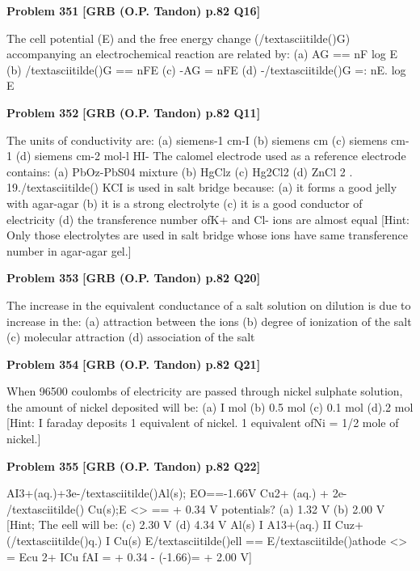 \begin{problembox}
\textbf{Problem 351} \hfill \textbf{[GRB (O.P. Tandon) p.82 Q16]}
\label{q:ext-grb_all_questions-351}

The cell potential (E) and the free energy change (/textasciitilde()G) 
accompanying an electrochemical reaction are related by: 
(a) AG == nF log E 
(b) /textasciitilde()G == nFE 
(c) -AG = nFE 
(d) -/textasciitilde()G =: nE. log E
\end{problembox}

\begin{problembox}
\textbf{Problem 352} \hfill \textbf{[GRB (O.P. Tandon) p.82 Q11]}
\label{q:ext-grb_all_questions-352}

The units of conductivity are: 
(a) siemens-1 cm-I 
(b) siemens cm 
(c) siemens cm-1 
(d) siemens cm-2 mol-l 
HI-
The calomel electrode used as a reference electrode contains: 
(a) PbOz-PbS04 mixture 
(b) HgClz 
(c) Hg2Cl2 
(d) ZnCl 2 . 
19./textasciitilde() KCI is used in salt bridge because: 
(a) it forms a good jelly with agar-agar 
(b) it is a strong electrolyte 
(c) it is a good conductor of electricity 
(d) the transference number ofK+ and Cl- ions are almost 
equal 
[Hint: 
Only those electrolytes are used in salt bridge whose 
ions have same transference number in agar-agar gel.]
\end{problembox}

\begin{problembox}
\textbf{Problem 353} \hfill \textbf{[GRB (O.P. Tandon) p.82 Q20]}
\label{q:ext-grb_all_questions-353}

The increase in the equivalent conductance of a salt solution 
on dilution is due to increase in the: 
(a) attraction between the ions 
(b) degree of ionization of the salt 
(c) molecular attraction 
(d) association of the salt
\end{problembox}

\begin{problembox}
\textbf{Problem 354} \hfill \textbf{[GRB (O.P. Tandon) p.82 Q21]}
\label{q:ext-grb_all_questions-354}

When 96500 coulombs of electricity are passed through nickel 
sulphate solution, the amount of nickel deposited will be: 
(a) I mol 
(b) 0.5 mol 
(c) 0.1 mol 
(d).2 mol 
[Hint: 
I faraday deposits 1 equivalent of nickel. 
1 equivalent ofNi = 1/2 mole of nickel.]
\end{problembox}

\begin{problembox}
\textbf{Problem 355} \hfill \textbf{[GRB (O.P. Tandon) p.82 Q22]}
\label{q:ext-grb_all_questions-355}

AI3+(aq.)+3e-/textasciitilde()Al(s); EO==-1.66V 
Cu2+ (aq.) + 2e- /textasciitilde() 
Cu(s);E <> == + 0.34 V 
potentials? 
(a) 1.32 V 
(b) 2.00 V 
[Hint; 
The eell will be: 
(c) 2.30 V 
(d) 4.34 V 
Al(s) I A13+(aq.) II Cuz+(/textasciitilde()q.) I Cu(s) 
E/textasciitilde()ell == E/textasciitilde()athode 
<> 
= Ecu 2+ ICu 
fAI 
= + 0.34 - (-1.66)= + 2.00 V]
\end{problembox}

